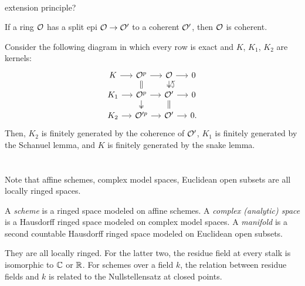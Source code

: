 \documentclass{../../large}
\begin{document}
\begin{prb}\,
\begin{parts}
\item extension principle?
\item If a ring $\mathcal{O}$ has a split epi $\mathcal{O}\to\mathcal{O}'$ to a coherent $\mathcal{O}'$, then $\mathcal{O}$ is coherent.
\end{parts}
\end{prb}
\begin{pf}
Consider the following diagram in which every row is exact and $K$, $K_1$, $K_2$ are kernels:
\[\begin{tikzcd}[sep=small]
K \rar & \cO^p \rar\dar[equals] & \cO \rar\dar[two heads] & 0\\
K_1 \rar & \cO^p \rar\dar[two heads] & \cO' \rar\dar[equals]\uar[hookrightarrow,bend right] & 0\\
K_2 \rar & \cO'^p \rar & \cO' \rar & 0.
\end{tikzcd}\]
Then, $K_2$ is finitely generated by the coherence of $\mathcal{O}'$, $K_1$ is finitely generated by the Schanuel lemma, and $K$ is finitely generated by the snake lemma.
\end{pf}




\section{}

Note that affine schemes, complex model spaces, Euclidean open subsets are all locally ringed spaces.

A \emph{scheme} is a ringed space modeled on affine schemes.
A \emph{complex (analytic) space} is a Hausdorff ringed space modeled on complex model spaces.
A \emph{manifold} is a second countable Hausdorff ringed space modeled on Euclidean open subsets.

They are all locally ringed.
For the latter two, the residue field at every stalk is isomorphic to $\mathbb{C}$ or $\mathbb{R}$.
For schemes over a field $k$, the relation between residue fields and $k$ is related to the Nullstellensatz at closed points.
\end{document}
